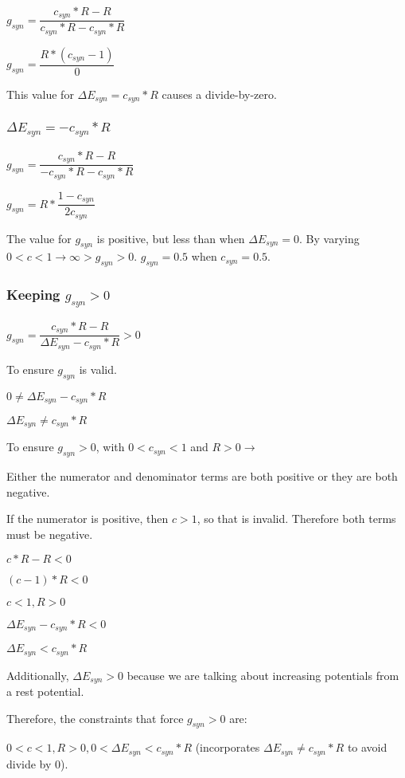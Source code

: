 $g_{syn} = \dfrac{c_{syn} * R - R}{c_{syn} * R - c_{syn} * R}$

$g_{syn} = \dfrac{R * (c_{syn} - 1)}{0}$

This value for $\Delta E_{syn} = c_{syn} * R$ causes a divide-by-zero.

\subsubsection{$\Delta E_{syn} = -c_{syn} * R$}

$g_{syn} = \dfrac{c_{syn} * R - R}{-c_{syn} * R - c_{syn} * R}$

$g_{syn} = R * \dfrac{1 - c_{syn}}{2 c_{syn}}$

The value for $g_{syn}$ is positive, but less than when $\Delta E_{syn} = 0$.
By varying $0 < c < 1 \rightarrow \infty > g_{syn} > 0$. $g_{syn} = 0.5$ when $c_{syn} = 0.5$.

\subsubsection{Keeping $g_{syn} > 0$}

$g_{syn} = \dfrac{c_{syn} * R - R}{\Delta E_{syn} - c_{syn} * R} > 0$

To ensure $g_{syn}$ is valid.

$0 \neq \Delta E_{syn} - c_{syn} * R$

$\Delta E_{syn} \neq c_{syn} * R$

To ensure $g_{syn} > 0$, with $0 < c_{syn} < 1$ and $R > 0 \rightarrow$

Either the numerator and denominator terms are both positive or they are both negative.

If the numerator is positive, then $c > 1$, so that is invalid. Therefore both terms must be negative.

$c*R - R < 0$

$(c - 1) * R < 0$

$c < 1, R > 0$

$\Delta E_{syn} - c_{syn} * R < 0$

$\Delta E_{syn} < c_{syn} * R$

Additionally, $\Delta E_{syn} > 0$ because we are talking about increasing potentials from a rest potential.

Therefore, the constraints that force $g_{syn} >0$ are:

$0 < c < 1, R > 0, 0 < \Delta E_{syn} < c_{syn} * R$ (incorporates $\Delta E_{syn} \neq c_{syn} * R$ to avoid divide by 0).

